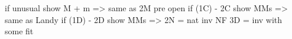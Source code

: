 if unusual show M + m => same as 2M pre open
if (1C) - 2C show MMs => same as Landy
if (1D) - 2D show MMs => 
    2N = nat inv NF
    3D = inv with some fit
